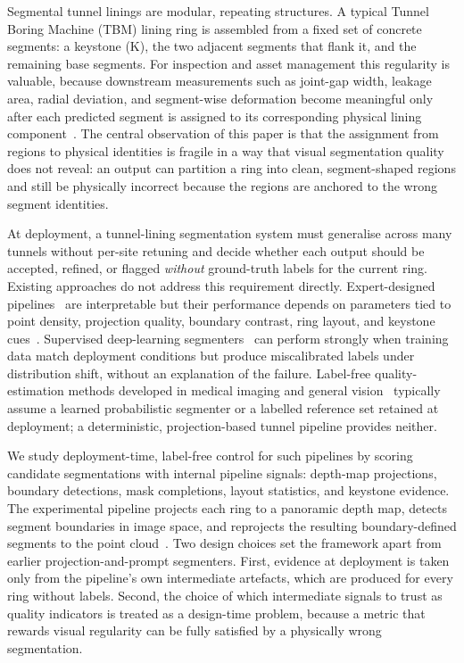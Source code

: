 \documentclass[a4paper,fleqn]{cas-dc}
\begin{document}
Segmental tunnel linings are modular, repeating structures. A typical Tunnel Boring Machine (TBM) lining ring is assembled from a fixed set of concrete segments: a keystone (K), the two adjacent segments that flank it, and the remaining base segments. For inspection and asset management this regularity is valuable, because downstream measurements such as joint-gap width, leakage area, radial deviation, and segment-wise deformation become meaningful only after each predicted segment is assigned to its corresponding physical lining component~\cite{montero2015roboticTunnelInspection,attard2018tunnelInspectionReview,sjolander2023automatedTunnelInspections}. The central observation of this paper is that the assignment from regions to physical identities is fragile in a way that visual segmentation quality does not reveal: an output can partition a ring into clean, segment-shaped regions and still be physically incorrect because the regions are anchored to the wrong segment identities.

At deployment, a tunnel-lining segmentation system must generalise across many tunnels without per-site retuning and decide whether each output should be accepted, refined, or flagged \emph{without} ground-truth labels for the current ring. Existing approaches do not address this requirement directly. Expert-designed pipelines~\cite{attard2018tunnelInspectionReview,montero2015roboticTunnelInspection} are interpretable but their performance depends on parameters tied to point density, projection quality, boundary contrast, ring layout, and keystone cues~\cite{huang2021bimMlUnderground,sjolander2023automatedTunnelInspections}. Supervised deep-learning segmenters~\cite{hu2020randlanet,thomas2019kpconv,zhang2022unrollingnet,ji2023spcnet,zhou2023aspcnet,lin2024seg2tunnel} can perform strongly when training data match deployment conditions but produce miscalibrated labels under distribution shift, without an explanation of the failure. Label-free quality-estimation methods developed in medical imaging and general vision~\cite{kohlberger2012segmentationError,valindria2017rca,robinson2018segmentationQuality} typically assume a learned probabilistic segmenter or a labelled reference set retained at deployment; a deterministic, projection-based tunnel pipeline provides neither.

We study deployment-time, label-free control for such pipelines by scoring candidate segmentations with internal pipeline signals: depth-map projections, boundary detections, mask completions, layout statistics, and keystone evidence. The experimental pipeline projects each ring to a panoramic depth map, detects segment boundaries in image space, and reprojects the resulting boundary-defined segments to the point cloud~\cite{ye2025sam4tun}. Two design choices set the framework apart from earlier projection-and-prompt segmenters. First, evidence at deployment is taken only from the pipeline's own intermediate artefacts, which are produced for every ring without labels. Second, the choice of which intermediate signals to trust as quality indicators is treated as a design-time problem, because a metric that rewards visual regularity can be fully satisfied by a physically wrong segmentation.
\end{document}
